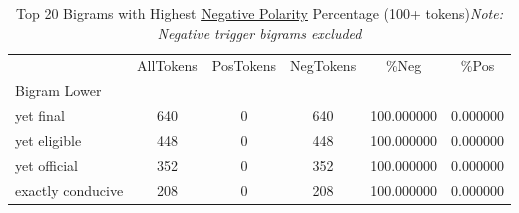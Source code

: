 

\singlespacing
\scriptsize\noindent
\begin{table}
\centering
\caption{Top 20 Bigrams with Highest \underline{Negative Polarity} Percentage (100+ tokens)\textit{Note: Negative trigger bigrams excluded}}
\label{tab:top20NegPercent100+}
\begin{tabular}{*{1}{l}S[table-auto-round, table-format=7.2, drop-zero-decimal]
    S[table-auto-round, table-format=7.2, drop-zero-decimal]
    S[table-auto-round, table-format=7.2, drop-zero-decimal]
    S[table-auto-round, table-format=7.2, drop-zero-decimal]
    S[table-auto-round, table-format=7.2, drop-zero-decimal]}
\toprule
{} & {AllTokens} & {PosTokens} & {NegTokens} & {\%Neg} & {\%Pos} \\
{Bigram Lower} & {} & {} & {} & {} & {} \\
\midrule
yet final & {} \color[HTML]{F1F1F1} 640 & {} \color[HTML]{000000} 0 & {} \color[HTML]{F1F1F1} 640 & {} \color[HTML]{F1F1F1} 100.000000 & {} \color[HTML]{000000} 0.000000 \\
yet eligible & {} \color[HTML]{F1F1F1} 448 & {} \color[HTML]{000000} 0 & {} \color[HTML]{F1F1F1} 448 & {} \color[HTML]{F1F1F1} 100.000000 & {} \color[HTML]{000000} 0.000000 \\
yet official & {} \color[HTML]{000000} 352 & {} \color[HTML]{000000} 0 & {} \color[HTML]{000000} 352 & {} \color[HTML]{F1F1F1} 100.000000 & {} \color[HTML]{000000} 0.000000 \\
exactly conducive & {} \color[HTML]{000000} 208 & {} \color[HTML]{000000} 0 & {} \color[HTML]{000000} 208 & {} \color[HTML]{F1F1F1} 100.000000 & {} \color[HTML]{000000} 0.000000 \\

\end{tabular}
\end{table}
